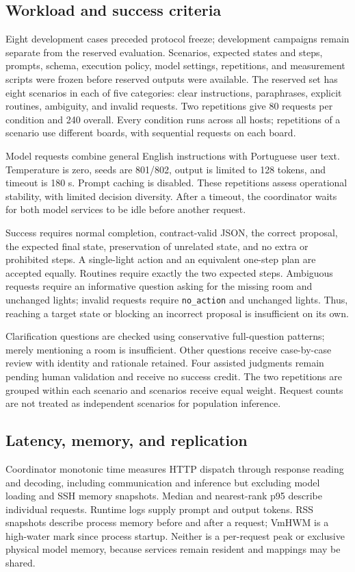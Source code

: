 \documentclass[letterpaper,conference]{IEEEtran}
\begin{document}
\subsection{Workload and success criteria}
Eight development cases preceded protocol freeze; development campaigns remain separate from the reserved evaluation. Scenarios, expected states and steps, prompts, schema, execution policy, model settings, repetitions, and measurement scripts were frozen before reserved outputs were available. The reserved set has eight scenarios in each of five categories: clear instructions, paraphrases, explicit routines, ambiguity, and invalid requests. Two repetitions give 80 requests per condition and 240 overall. Every condition runs across all hosts; repetitions of a scenario use different boards, with sequential requests on each board.

Model requests combine general English instructions with Portuguese user text. Temperature is zero, seeds are 801/802, output is limited to 128 tokens, and timeout is 180 s. Prompt caching is disabled. These repetitions assess operational stability, with limited decision diversity. After a timeout, the coordinator waits for both model services to be idle before another request.

Success requires normal completion, contract-valid JSON, the correct proposal, the expected final state, preservation of unrelated state, and no extra or prohibited steps. A single-light action and an equivalent one-step plan are accepted equally. Routines require exactly the two expected steps. Ambiguous requests require an informative question asking for the missing room and unchanged lights; invalid requests require \texttt{no\_action} and unchanged lights. Thus, reaching a target state or blocking an incorrect proposal is insufficient on its own.

Clarification questions are checked using conservative full-question patterns; merely mentioning a room is insufficient. Other questions receive case-by-case review with identity and rationale retained. Four assisted judgments remain pending human validation and receive no success credit. The two repetitions are grouped within each scenario and scenarios receive equal weight. Request counts are not treated as independent scenarios for population inference.

\subsection{Latency, memory, and replication}
Coordinator monotonic time measures HTTP dispatch through response reading and decoding, including communication and inference but excluding model loading and SSH memory snapshots. Median and nearest-rank p95 describe individual requests. Runtime logs supply prompt and output tokens. RSS snapshots describe process memory before and after a request; VmHWM is a high-water mark since process startup. Neither is a per-request peak or exclusive physical model memory, because services remain resident and mappings may be shared.
\end{document}
